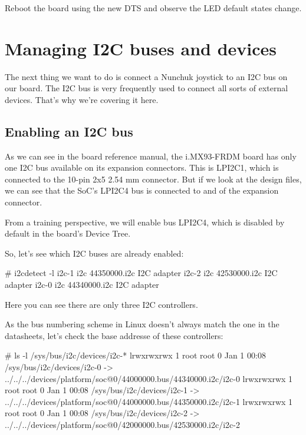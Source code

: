 Reboot the board using the new DTS and observe the LED default states
change.

\section{Managing I2C buses and devices}

The next thing we want to do is connect a Nunchuk joystick
to an I2C bus on our board. The I2C bus is very frequently used
to connect all sorts of external devices. That's why we're covering
it here.

\subsection{Enabling an I2C bus}

As we can see in the board reference manual, the i.MX93-FRDM board has
only one I2C bus available on its expansion connectors. This is LPI2C1,
which is connected to the 10-pin 2x5 2.54 mm connector. But if we look
at the design files, we can see that the SoC's LPI2C4 bus is connected
to  and  of the expansion
connector.

From a training perspective, we will enable bus LPI2C4, which is
disabled by default in the board's Device Tree.

So, let's see which I2C buses are already enabled:

\begin{bashinput}
# i2cdetect -l 
i2c-1	i2c       	44350000.i2c                    	I2C adapter
i2c-2	i2c       	42530000.i2c                    	I2C adapter
i2c-0	i2c       	44340000.i2c                    	I2C adapter

\end{bashinput}

Here you can see there are only three I2C controllers.

As the bus numbering scheme in Linux doesn't always match the one
in the datasheets, let's check the base addresse of these controllers:

\begin{bashinput}
# ls -l /sys/bus/i2c/devices/i2c-*
lrwxrwxrwx    1 root     root             0 Jan  1 00:08 /sys/bus/i2c/devices/i2c-0 -> ../../../devices/platform/soc@0/44000000.bus/44340000.i2c/i2c-0
lrwxrwxrwx    1 root     root             0 Jan  1 00:08 /sys/bus/i2c/devices/i2c-1 -> ../../../devices/platform/soc@0/44000000.bus/44350000.i2c/i2c-1
lrwxrwxrwx    1 root     root             0 Jan  1 00:08 /sys/bus/i2c/devices/i2c-2 -> ../../../devices/platform/soc@0/42000000.bus/42530000.i2c/i2c-2

\end{bashinput}

